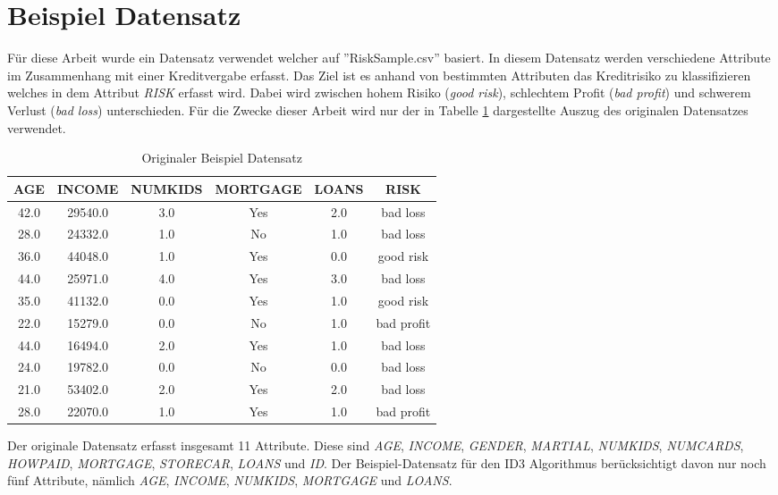 \section{Beispiel Datensatz}
\label{id3:datensatz}
Für diese Arbeit wurde ein Datensatz verwendet welcher auf ''RiskSample.csv'' basiert. \Autocite{RiskSample} In diesem Datensatz werden verschiedene Attribute im Zusammenhang mit einer Kreditvergabe erfasst. Das Ziel ist es anhand von bestimmten Attributen das Kreditrisiko zu klassifizieren welches in dem Attribut \textit{RISK} erfasst wird. Dabei wird zwischen hohem Risiko (\textit{good risk}), schlechtem Profit (\textit{bad profit}) und schwerem Verlust (\textit{bad loss}) unterschieden. Für die Zwecke dieser Arbeit wird nur der in Tabelle \ref{table:datensatz} dargestellte Auszug des originalen Datensatzes verwendet.

\begin{table}[htbp]
    \centering
    \begin{tabularx}{\linewidth}{cccccc}
        \toprule
        \textbf{AGE} & \textbf{INCOME} & \textbf{NUMKIDS} & \textbf{MORTGAGE} & \textbf{LOANS} & \textbf{RISK} \\
        \toprule
        42.0    &29540.0	&3.0	&Yes	&2.0	&bad loss       \\
        28.0	&24332.0	&1.0	&No 	&1.0	&bad loss       \\
        36.0	&44048.0	&1.0	&Yes	&0.0	&good risk      \\ 
        44.0	&25971.0	&4.0	&Yes    &3.0	&bad loss       \\
        35.0	&41132.0	&0.0	&Yes	&1.0	&good risk      \\
        22.0	&15279.0	&0.0	&No 	&1.0	&bad profit     \\
        44.0	&16494.0	&2.0	&Yes	&1.0	&bad loss       \\
        24.0	&19782.0	&0.0	&No 	&0.0	&bad loss       \\
        21.0	&53402.0	&2.0	&Yes	&2.0	&bad loss       \\
        28.0	&22070.0	&1.0	&Yes	&1.0	&bad profit     \\
        \bottomrule
    \end{tabularx}
    \caption{Originaler Beispiel Datensatz}
    \label{table:datensatz}
\end{table}

Der originale Datensatz erfasst insgesamt 11 Attribute. Diese sind \textit{AGE}, \textit{INCOME}, \textit{GENDER}, \textit{MARTIAL}, \textit{NUMKIDS}, \textit{NUMCARDS}, \textit{HOWPAID}, \textit{MORTGAGE}, \textit{STORECAR}, \textit{LOANS} und \textit{ID}. Der Beispiel-Datensatz für den ID3 Algorithmus berücksichtigt davon nur noch fünf Attribute, nämlich \textit{AGE}, \textit{INCOME}, \textit{NUMKIDS}, \textit{MORTGAGE} und \textit{LOANS}.

